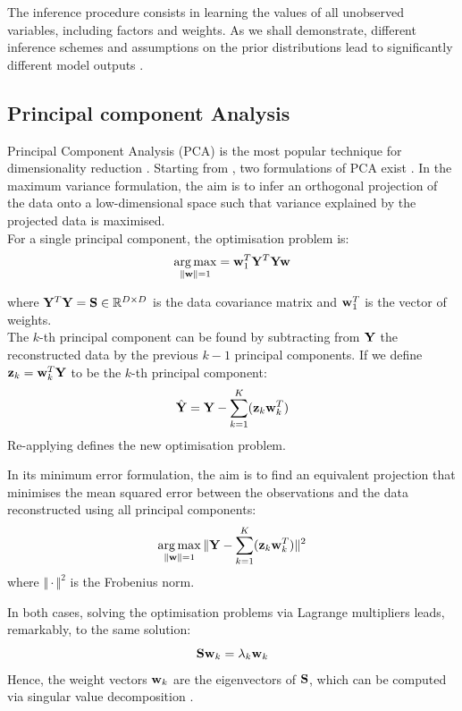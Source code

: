 The inference procedure consists in learning the values of all unobserved variables, including factors and weights. As we shall demonstrate, different inference schemes and assumptions on the prior distributions lead to significantly different model outputs \cite{Rattray2009}.


\subsection{Principal component Analysis} \label{section:pca}

Principal Component Analysis (PCA) is the most popular technique for dimensionality reduction \cite{Hotelling1933,Ringner2008}. Starting from , two formulations of PCA exist \cite{Bishop2006}. In the maximum variance formulation, the aim is to infer an orthogonal projection of the data onto a low-dimensional space such that variance explained by the projected data is maximised.\\
For a single principal component, the optimisation problem is:
\begin{equation} \label{eq:pca}
	\operatorname*{arg\,max}_{\|{\bf w}\|=1} = {\bf w}_1^T {\bf Y}^T {\bf Y} {\bf w}
\end{equation}

where ${\bf Y}^T {\bf Y}={\bf S} \in \mathbb{R}^{D \times D}$ is the data covariance matrix and ${\bf w}_1^T$ is the vector of weights. \\
The $k$-th principal component can be found by subtracting from ${\bf Y}$ the reconstructed data by the previous $k-1$ principal components. If we define ${\bf z}_k={\bf w}_k^T {\bf Y}$ to be the $k$-th principal component:
\[
	\hat{{\bf Y}} = {\bf Y} - \sum_{k=1}^{K} ({\bf z}_k {\bf w}_k^T)
\]
Re-applying  defines the new optimisation problem.

In its minimum error formulation, the aim is to find an equivalent projection that minimises the mean squared error between the observations and the data reconstructed using all principal components:
\[
	\operatorname*{arg\,max}_{\|{\bf w}\|=1} \Vert {\bf Y} - \sum_{k=1}^{K} ({\bf z}_k {\bf w}_k^T) \Vert^{2}
\]
where $\Vert \cdot \Vert^{2}$ is the Frobenius norm.

In both cases, solving the optimisation problems via Lagrange multipliers leads, remarkably, to the same solution:
\begin{equation}
	{\bf S} {\bf w}_k = \lambda_k {\bf w}_k
\end{equation}
Hence, the weight vectors ${\bf w}_k$ are the eigenvectors of ${\bf S}$, which can be computed via singular value decomposition \cite{Bishop2006}.

